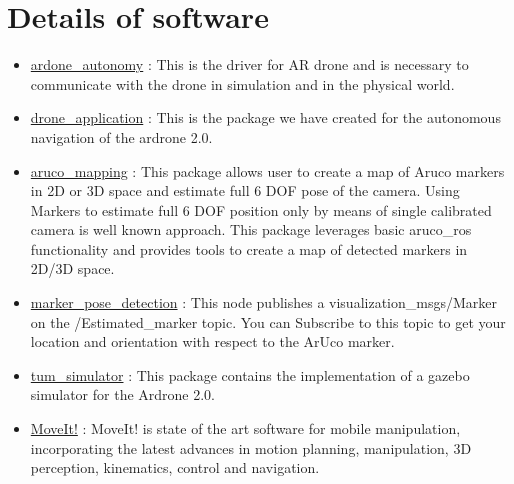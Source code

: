 \documentclass[a4paper,12pt,oneside]{book}
\begin{document}
  \section{Details of software}  
 \begin{itemize}
 \item  \href{http://wiki.ros.org/ardrone_autonomy}{ardone\_autonomy} : This is the driver for AR drone and is necessary to communicate with the drone in simulation and in the physical world.

  
 \item  \href{http://wiki.coins-lab.org/index.php?title=Simulation_of_AR_Parrot_2}{drone\_application} : This is the package we have created for the autonomous navigation of the ardrone 2.0. 

 \item  \href{http://wiki.ros.org/aruco_mapping}{aruco\_mapping} : This package allows user to create a map of Aruco markers in 2D or 3D space and estimate full 6 DOF pose of the camera. Using Markers to estimate full 6 DOF position only by means of single calibrated camera is well known approach. This package leverages basic aruco\_ros functionality and provides tools to create a map of detected markers in 2D/3D space. 


 \item  \href{https://github.com/durovsky/marker_pose_detection}{marker\_pose\_detection} : This node publishes a visualization\_msgs/Marker on the /Estimated\_marker topic. You can Subscribe to this topic to get your location and orientation with respect to the ArUco marker.
 
 \item  \href{http://wiki.ros.org/tum_simulator}{tum\_simulator} : This package contains the implementation of a gazebo simulator for the Ardrone 2.0.

 
 
 \item   \href{ https://www.wilselby.com/research/ros-integration/3d-mapping-navigation/}{MoveIt!} : MoveIt! is state of the art software for mobile manipulation, incorporating the latest advances in motion planning, manipulation, 3D perception, kinematics, control and navigation.

 \end{itemize}

 
\end{document}
